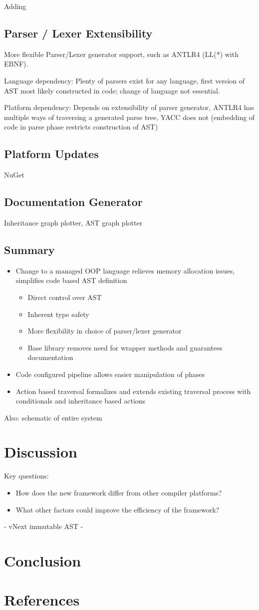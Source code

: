 \documentclass[final,a4paper,12pt]{article}
\begin{document}
Adding 

\subsection{Parser / Lexer Extensibility}
More flexible Parser/Lexer generator support, such as ANTLR4 (LL(*) with EBNF).

Language dependency: Plenty of parsers exist for any language, first version of AST most likely constructed in code; change of language not essential.

Platform dependency: Depends on extensibility of parser generator, ANTLR4 has multiple ways of traversing a generated parse tree, YACC does not (embedding of code in parse phase restricts construction of AST)
\subsection{Platform Updates}
NuGet
\subsection{Documentation Generator}
Inheritance graph plotter, AST graph plotter
\subsection{Summary}
\begin{itemize}
	\item Change to a managed OOP language relieves memory allocation issues, simplifies code based AST definition
	\begin{itemize}
		\item Direct control over AST
		\item Inherent type safety
		\item More flexibility in choice of parser/lexer generator
		\item Base library removes need for wrapper methods and guarantees documentation
	\end{itemize}
	\item Code configured pipeline allows easier manipulation of phases
	\item Action based traversal formalizes and extends existing traversal process with conditionals and inheritance based actions
\end{itemize}
Also: schematic of entire system
\section{Discussion}
Key questions:
\begin{itemize}
	\item How does the new framework differ from other compiler platforms?
	\item What other factors could improve the efficiency of the framework?
\end{itemize}

- vNext immutable AST
- 

\section{Conclusion}



\section{References}


\end{document}
